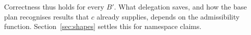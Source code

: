 Correctness thus holds for every $B'$. What delegation saves, and how the base plan
recognises results that $c$ already supplies, depends on the admissibility function.
Section~\ref{sec:shapes} settles this for namespace claims.




